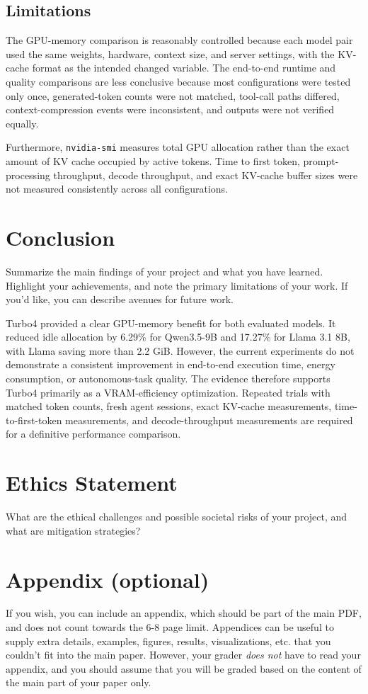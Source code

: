 \documentclass{article}
\begin{document}
\subsection{Limitations}

The GPU-memory comparison is reasonably controlled because each model pair
used the same weights, hardware, context size, and server settings, with the
KV-cache format as the intended changed variable. The end-to-end runtime and
quality comparisons are less conclusive because most configurations were
tested only once, generated-token counts were not matched, tool-call paths
differed, context-compression events were inconsistent, and outputs were not
verified equally.

Furthermore, \texttt{nvidia-smi} measures total GPU allocation rather than
the exact amount of KV cache occupied by active tokens. Time to first token,
prompt-processing throughput, decode throughput, and exact KV-cache buffer
sizes were not measured consistently across all configurations.

\section{Conclusion}
Summarize the main findings of your project and what you have learned. Highlight your achievements, and note the primary limitations of your work. If you'd like, you can describe avenues for future work.

Turbo4 provided a clear GPU-memory benefit for both evaluated models. It
reduced idle allocation by 6.29\% for Qwen3.5-9B and 17.27\% for Llama 3.1
8B, with Llama saving more than 2.2 GiB. However, the current experiments do
not demonstrate a consistent improvement in end-to-end execution time,
energy consumption, or autonomous-task quality. The evidence therefore
supports Turbo4 primarily as a VRAM-efficiency optimization. Repeated trials
with matched token counts, fresh agent sessions, exact KV-cache measurements,
time-to-first-token measurements, and decode-throughput measurements are
required for a definitive performance comparison.

\section{Ethics Statement}
What are the ethical challenges and possible societal risks of your project, and
what are mitigation strategies?




\appendix

\section{Appendix (optional)}
If you wish, you can include an appendix, which should be part of the main PDF, and does not count towards the 6-8 page limit.
Appendices can be useful to supply extra details, examples, figures, results, visualizations, etc. that you couldn't fit into the main paper. However, your grader \textit{does not} have to read your appendix, and you should assume that you will be graded based on the content of the main part of your paper only.
\end{document}
